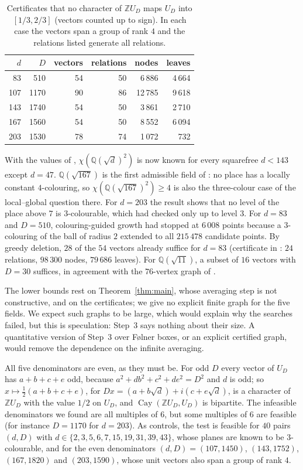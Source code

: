 \documentclass[11pt,a4paper]{amsart}
\theoremstyle{definition}
\newcommand{\Q}{\mathbb{Q}}
\newcommand{\Z}{\mathbb{Z}}
\newcommand{\Cay}{\operatorname{Cay}}
\begin{document}
\begin{table}[ht]
\centering
\begin{tabular}{rrrrrr}
\toprule
$d$ & $D$ & vectors & relations & nodes & leaves\\
\midrule
83 & 510 & 54 & 50 & 6\,886 & 4\,664\\
107 & 1170 & 90 & 86 & 12\,785 & 9\,618\\
143 & 1740 & 54 & 50 & 3\,861 & 2\,710\\
167 & 1560 & 54 & 50 & 8\,552 & 6\,094\\
203 & 1530 & 78 & 74 & 1\,072 & 732\\
\bottomrule
\end{tabular}
\caption{Certificates that no character of $\Z U_D$ maps $U_D$ into $[1/3,2/3]$ (vectors counted up to sign).
In each case the vectors span a group of rank $4$ and the relations listed generate all relations.}
\label{tab:certs}
\end{table}

With the values of \cite{QP}, $\chi(\Q(\sqrt d)^2)$ is now known for every squarefree $d<143$ except $d=47$.
$\Q(\sqrt{167})$ is the first admissible field of \cite{LG}: no place has a locally constant $4$-colouring, so
$\chi(\Q(\sqrt{167})^2)\ge4$ is also the three-colour case of the local--global question there. For $d=203$ the
result shows that no level of the place above $7$ is $3$-colourable, which \cite{LG} had checked only up to level
$3$. For $d=83$ and $D=510$, colouring-guided growth had stopped at $6\,008$ points because a $3$-colouring of the
ball of radius $2$ extended to all $215\,478$ candidate points. By greedy deletion, $28$ of the $54$ vectors already
suffice for $d=83$ (certificate in \cite{Repo}: $24$ relations, $98\,300$ nodes, $79\,686$ leaves). For $\Q(\sqrt{11})$, a
subset of $16$ vectors with $D=30$ suffices, in agreement with the $76$-vertex graph of \cite{QP}.

The lower bounds rest on Theorem~\ref{thm:main}, whose averaging step is not constructive, and on the
certificates; we give no explicit finite graph for the five fields. We expect such graphs to be large, which would
explain why the searches failed, but this is speculation: Step~3 says nothing about their size. A quantitative
version of Step~3 over F\o lner boxes, or an explicit certified graph, would remove the dependence on the infinite
averaging.

All five denominators are even, as they must be. For odd $D$ every vector of $U_D$ has $a+b+c+e$ odd, because
$a^2+db^2+c^2+de^2=D^2$ and $d$ is odd; so $x\mapsto\frac12(a+b+c+e)$, for $Dx=(a+b\sqrt d)+i(c+e\sqrt d)$, is a
character of $\Z U_D$ with the value $1/2$ on $U_D$, and $\Cay(\Z U_D,U_D)$ is bipartite. The infeasible
denominators we found are all multiples of $6$, but some multiples of $6$ are feasible (for instance $D=1170$ for
$d=203$). As controls, the test is feasible for $40$ pairs $(d,D)$ with $d\in\{2,3,5,6,7,15,19,31,39,43\}$, whose
planes are known to be $3$-colourable, and for the even denominators $(d,D)=(107,1450)$, $(143,1752)$,
$(167,1820)$ and $(203,1590)$, whose unit vectors also span a group of rank $4$.
\end{document}
